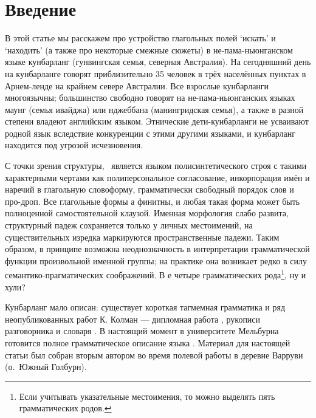 \section{Введение}
В этой статье мы расскажем про устройство глагольных полей `искать' и `находить' (а также про некоторые смежные сюжеты) в не-пама-ньюнганском языке кунбарланг (гунвингская семья, северная Австралия). На сегодняшний день на кунбарланге говорят приблизительно 35 человек в трёх населённых пунктах в Арнем-ленде на крайнем севере Австралии. Все взрослые кунбарланги многоязычны; большинство свободно говорят на не-пама-ньюнганских языках маунг (семья ивайджа) или нджеббана (манингридская семья), а также в разной степени владеют английским языком. Этнические дети-кунбарланги не усваивают родной язык вследствие конкуренции с этими другими языками, и кунбарланг находится под угрозой исчезновения.

С точки зрения структуры, \ является языком полисинтетического строя с такими характерными чертами как полиперсональное согласование, инкорпорация имён и наречий в глагольную словоформу, грамматически свободный порядок слов и про-дроп. Все глагольные формы  а финитны, и любая такая форма может быть полноценной самостоятельной клаузой. Именная морфология слабо развита, структурный падеж сохраняется только у личных местоимений, на существительных изредка маркируются пространственные падежи. Таким образом, в принципе возможна неоднозначность в интерпретации грамматической функции произвольной именной группы; на практике она возникает редко в силу семантико-прагматических соображений. %
В  е четыре грамматических рода\footnote{Если учитывать указательные местоимения, то можно выделять пять грамматических родов.}, ну и хули?

Кунбарланг мало описан: существует короткая тагмемная грамматика \cite{harris69} и ряд неопубликованных работ К. Колман --- дипломная работа \cite{coleman82}, рукописи разговорника \parencite{wordgra} и словаря \parencite{coleman10}. В настоящий момент в университете Мельбурна готовится полное грамматическое описание языка \parencite{ikwlg}. 
Материал для настоящей статьи был собран вторым автором во время полевой работы в деревне Варруви (о.\ Южный Голбурн). %



